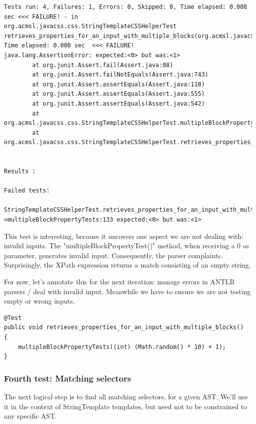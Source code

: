 \documentclass[11pt]{article}
\begin{document}
\begin{verbatim}
Tests run: 4, Failures: 1, Errors: 0, Skipped: 0, Time elapsed: 0.008 sec <<< FAILURE! - in org.acmsl.javacss.css.StringTemplateCSSHelperTest
retrieves_properties_for_an_input_with_multiple_blocks(org.acmsl.javacss.css.StringTemplateCSSHelperTest)  Time elapsed: 0.008 sec  <<< FAILURE!
java.lang.AssertionError: expected:<0> but was:<1>
        at org.junit.Assert.fail(Assert.java:88)
        at org.junit.Assert.failNotEquals(Assert.java:743)
        at org.junit.Assert.assertEquals(Assert.java:118)
        at org.junit.Assert.assertEquals(Assert.java:555)
        at org.junit.Assert.assertEquals(Assert.java:542)
        at org.acmsl.javacss.css.StringTemplateCSSHelperTest.multipleBlockPropertyTests(StringTemplateCSSHelperTest.java:133)
        at org.acmsl.javacss.css.StringTemplateCSSHelperTest.retrieves_properties_for_an_input_with_multiple_blocks(StringTemplateCSSHelperTest.java:158)


Results :

Failed tests:
  StringTemplateCSSHelperTest.retrieves_properties_for_an_input_with_multiple_blocks:158->multipleBlockPropertyTests:133 expected:<0> but was:<1>
\end{verbatim}

This test is interesting, because it uncovers one aspect we are not dealing with: invalid inputs. The "multipleBlockPropertyTest()" method, when receiving a 0 as parameter, generates
invalid input. Consequently, the parser complaints. Surprisingly, the XPath expression returns a match consisting of an empty string.

For now, let's annotate this for the next iteration: manage errors in ANTLR parsers / deal with invalid input. Meanwhile we have
to ensure we are not testing empty or wrong inputs.

\begin{verbatim}
@Test
public void retrieves_properties_for_an_input_with_multiple_blocks()
{
    multipleBlockPropertyTests((int) (Math.random() * 10) + 1);
}
\end{verbatim}

\subsubsection{Fourth test: Matching selectors}
\label{sec-1-4-5}

The next logical step is to find all matching selectors, for a given AST. We'll use it in the context of StringTemplate templates, but
need not to be constrained to any specific AST.
\end{document}
